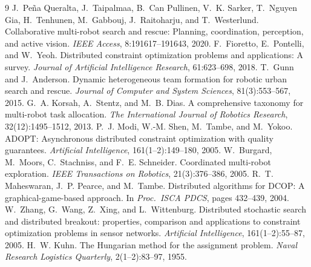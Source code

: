 \documentclass{article}
\begin{document}
\footnotesize
\begin{thebibliography}{9}\setlength\itemsep{0pt}
 J.~Pe\~na Queralta, J.~Taipalmaa, B.~Can Pullinen, V.~K. Sarker, T.~Nguyen Gia, H.~Tenhunen, M.~Gabbouj, J.~Raitoharju, and T.~Westerlund. Collaborative multi-robot search and rescue: Planning, coordination, perception, and active vision. \emph{IEEE Access}, 8:191617--191643, 2020.
 F.~Fioretto, E.~Pontelli, and W.~Yeoh. Distributed constraint optimization problems and applications: A survey. \emph{Journal of Artificial Intelligence Research}, 61:623--698, 2018.
 T.~Gunn and J.~Anderson. Dynamic heterogeneous team formation for robotic urban search and rescue. \emph{Journal of Computer and System Sciences}, 81(3):553--567, 2015.
 G.~A. Korsah, A.~Stentz, and M.~B. Dias. A comprehensive taxonomy for multi-robot task allocation. \emph{The International Journal of Robotics Research}, 32(12):1495--1512, 2013.
 P.~J. Modi, W.-M. Shen, M.~Tambe, and M.~Yokoo. ADOPT: Asynchronous distributed constraint optimization with quality guarantees. \emph{Artificial Intelligence}, 161(1--2):149--180, 2005.
 W.~Burgard, M.~Moors, C.~Stachniss, and F.~E. Schneider. Coordinated multi-robot exploration. \emph{IEEE Transactions on Robotics}, 21(3):376--386, 2005.
 R.~T. Maheswaran, J.~P. Pearce, and M.~Tambe. Distributed algorithms for DCOP: A graphical-game-based approach. In \emph{Proc.\ ISCA PDCS}, pages 432--439, 2004.
 W.~Zhang, G.~Wang, Z.~Xing, and L.~Wittenburg. Distributed stochastic search and distributed breakout: properties, comparison and applications to constraint optimization problems in sensor networks. \emph{Artificial Intelligence}, 161(1--2):55--87, 2005.
 H.~W. Kuhn. The Hungarian method for the assignment problem. \emph{Naval Research Logistics Quarterly}, 2(1--2):83--97, 1955.
\end{thebibliography}
\end{document}
